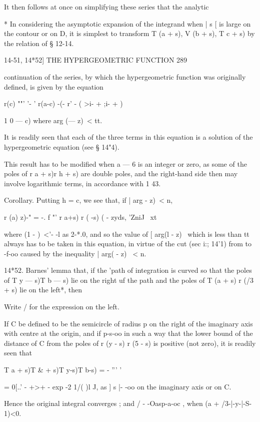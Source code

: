 It then follows at once on simplifying these series that the analytic

* In considering the asymptotic expansion of the integrand when | s [
is large on the contour or on D, it is simplest to transform T (a +
s), V (b + s), T c + s) by the relation of § 12-14.



14-51, 14*52] THE HYPERGEOMETRIC FUNCTION 289

continuation of the series, by which the hypergeometric function was
originally defined, is given by the equation

r(c) ""' '- ' r(a-c) -(- r' - ( >i- + ;i- + )

1 0 — c) where arg (— z)\ < tt.

It is readily seen that each of the three terms in this equation is a
solution of the hypergeometric equation (see § 14"4).

This result has to be modified when a — 6 is an integer or zero, as
some of the poles of r a + s)r h + s) are double poles, and the
right-hand side then may involve logarithmic terms, in accordance with
1 43.

Corollary. Putting h = c, we see that, if | arg - z)\ < n,

r (a) z)-" = -. f "' r a+s) r ( -s) ( - zyds, 'ZniJ \ xt

where (1 - )~<'- -l as 2-*.0, and so the value of [ arg(l - z) \ which
is less than tt always has to be taken in this equation, in virtue of
the cut (sec i:; 14'1) from to -f-oo caused by the inequality | arg( -
z) \ < n.

14*52. Barnes' lemma that, if the 'path of integration is curved so
that the poles of T y — s)T b — s) lie on the right uf the path and
the poles of T (a + s) r (/3 + s) lie on the left*, then

Write / for the expression on the left.

If C be defined to be the semicircle of radius p on the right of the
imaginary axis with centre at the origin, and if p-s-oo in such a way
that the lower bound of the distance of C from the poles of r (y - s)
r (5 - s) is positive (not zero), it is readily seen that

T a + s)T \& + s)T y-s)T b-s) = - ''' '

= 0[..' - +>+ - exp -2 1/( )l J, as ] s |- -oo on the imaginary axis
or on C.

Hence the original integral converges ; and / - -Oasp-a-oc , when (a +
/3-|-y-|-S- 1)<0.

